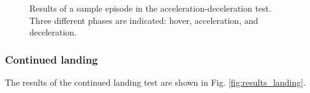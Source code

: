 \begin{figure}[htb]
    \centering
    \caption{Results of a sample episode in the acceleration-deceleration test. Three different phases are indicated: hover, acceleration, and deceleration.}
    \label{fig:results_acceldecel}
\end{figure}


\subsubsection{Continued landing}
The results of the continued landing test are shown in Fig. \ref{fig:results_landing}. 

